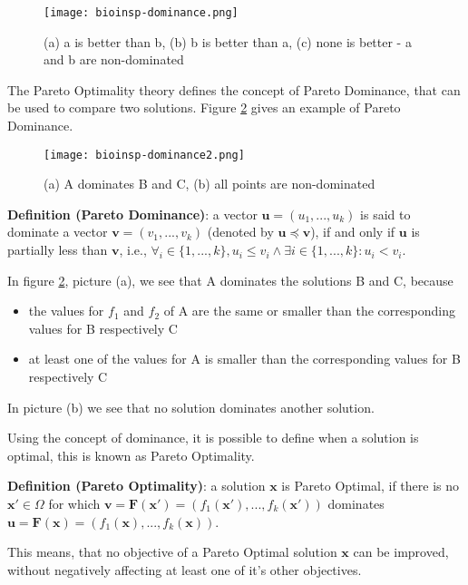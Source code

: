 \begin{figure}[ht!]
  \centering
  \texttt{[image: bioinsp-dominance.png]}
  \caption{(a) a is better than b, (b) b is better than a, (c) none is better - a and b are non-dominated}
  \label{fig:dominance}
\end{figure}

The Pareto Optimality theory defines the concept of Pareto Dominance, that can be used to compare two solutions. Figure \ref{fig:dominance2} gives an example of Pareto Dominance.

\begin{figure}[ht!]
  \centering
  \texttt{[image: bioinsp-dominance2.png]}
  \caption{(a) A dominates B and C, (b) all points are non-dominated}
  \label{fig:dominance2}
\end{figure}

\noindent\textbf{Definition (Pareto Dominance)}: a vector $\mathbf{u} = (u_1,...,u_k)$ is said to dominate a vector $\mathbf{v} = (v_1,...,v_k)$ (denoted by $\mathbf{u} \preceq \mathbf{v}$), if and only if $\mathbf{u}$ is partially less than $\mathbf{v}$, i.e., $\forall_i \in \{1,...,k\}, u_i \leq v_i \land \exists i \in \{1,...,k\}: u_i < v_i$.

In figure \ref{fig:dominance2}, picture (a), we see that A dominates the solutions B and C, because
\begin{itemize}
  \item the values for $f_1$ and $f_2$ of A are the same or smaller than the corresponding values for B respectively C
  \item at least one of the values for A is smaller than the corresponding values for B respectively C
\end{itemize}
In picture (b) we see that no solution dominates another solution.

Using the concept of dominance, it is possible to define when a solution is optimal, this is known as Pareto Optimality.

\noindent\textbf{Definition (Pareto Optimality)}: a solution $\mathbf{x}$ is Pareto Optimal, if there is no $\mathbf{x'} \in \Omega$ for which $\mathbf{v} = \mathbf{F}(\mathbf{x'}) = (f_1(\mathbf{x'}),...,f_k(\mathbf{x'}))$ dominates $\mathbf{u} = \mathbf{F}(\mathbf{x}) = (f_1(\mathbf{x}),...,f_k(\mathbf{x}))$.

This means, that no objective of a Pareto Optimal solution $\mathbf{x}$ can be improved, without negatively affecting at least one of it's other objectives.

